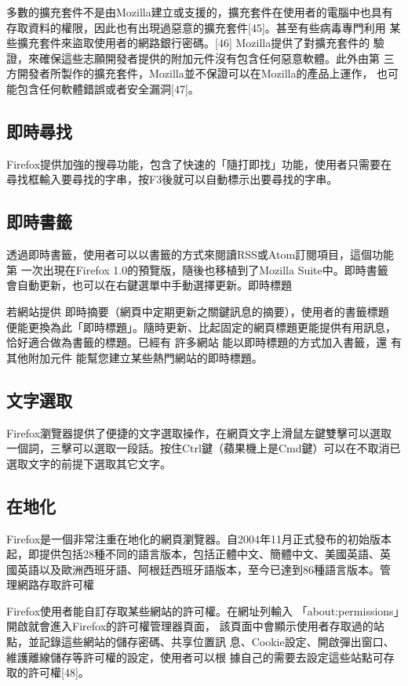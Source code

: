 \documentclass[12pt, a4paper, twoside]{article}
\begin{document}
多數的擴充套件不是由Mozilla建立或支援的，擴充套件在使用者的電腦中也具有
存取資料的權限，因此也有出現過惡意的擴充套件[45]。甚至有些病毒專門利用
某些擴充套件來盜取使用者的網路銀行密碼。[46] Mozilla提供了對擴充套件的
驗證，來確保這些志願開發者提供的附加元件沒有包含任何惡意軟體。此外由第
三方開發者所製作的擴充套件，Mozilla並不保證可以在Mozilla的產品上運作，
也可能包含任何軟體錯誤或者安全漏洞[47]。

\subsection{即時尋找}

Firefox提供加強的搜尋功能，包含了快速的「隨打即找」功能，使用者只需要在
尋找框輸入要尋找的字串，按F3後就可以自動標示出要尋找的字串。
\subsection{即時書籤}

透過即時書籤，使用者可以以書籤的方式來閱讀RSS或Atom訂閱項目，這個功能第
一次出現在Firefox 1.0的預覽版，隨後也移植到了Mozilla Suite中。即時書籤
會自動更新，也可以在右鍵選單中手動選擇更新。即時標題

若網站提供 即時摘要（網頁中定期更新之關鍵訊息的摘要），使用者的書籤標題
便能更換為此「即時標題」。隨時更新、比起固定的網頁標題更能提供有用訊息，
恰好適合做為書籤的標題。已經有 許多網站 能以即時標題的方式加入書籤，還
有 其他附加元件 能幫您建立某些熱門網站的即時標題。

\subsection{文字選取}

Firefox瀏覽器提供了便捷的文字選取操作，在網頁文字上滑鼠左鍵雙擊可以選取
一個詞，三擊可以選取一段話。按住Ctrl鍵（蘋果機上是Cmd鍵）可以在不取消已
選取文字的前提下選取其它文字。

\subsection{在地化}

Firefox是一個非常注重在地化的網頁瀏覽器。自2004年11月正式發布的初始版本
起，即提供包括28種不同的語言版本，包括正體中文、簡體中文、美國英語、英
國英語以及歐洲西班牙語、阿根廷西班牙語版本，至今已達到86種語言版本。管
理網路存取許可權

Firefox使用者能自訂存取某些網站的許可權。在網址列輸入
「about:\allowbreak{}permissions」開啟就會進入Firefox的許可權管理器頁面，
該頁面中會顯示使用者存取過的站點，並記錄這些網站的儲存密碼、共享位置訊
息、Cookie設定、開啟彈出窗口、維護離線儲存等許可權的設定，使用者可以根
據自己的需要去設定這些站點可存取的許可權[48]。
\end{document}
